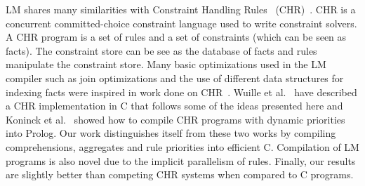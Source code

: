 
LM shares many similarities with Constraint Handling Rules~
(CHR)~\cite{Betz:2005kx,DBLP:journals/corr/abs-1006-3039}.  CHR is a concurrent
committed-choice constraint language used to write constraint solvers. A CHR
program is a set of rules and a set of constraints (which can be seen as facts).
The constraint store can be see as the database of facts and rules manipulate
the constraint store. Many basic optimizations used in the LM compiler such as
join optimizations and the use of different data structures for indexing facts
were inspired in work done on CHR~\cite{DBLP:journals/corr/cs-PL-0408025}.
Wuille et al.~\cite{42866} have described a CHR implementation in C that follows
some of the ideas presented here and Koninck et al.~\cite{chrp} showed how to
compile CHR programs with dynamic priorities into Prolog. Our work distinguishes
itself from these two works by compiling comprehensions, aggregates and rule
priorities into efficient C. Compilation of LM programs is also novel due to the
implicit parallelism of rules. Finally, our results are slightly better than
competing CHR systems when compared to C programs.
